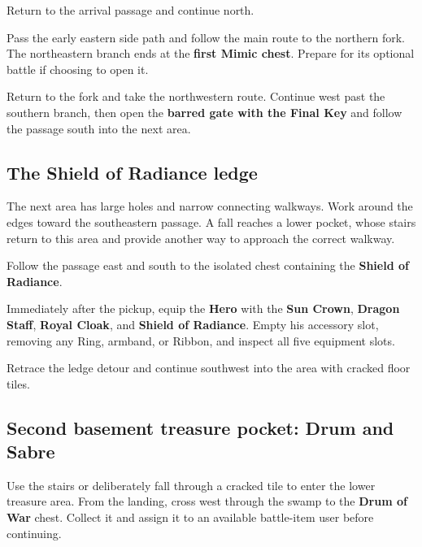 Return to the arrival passage and continue north.

Pass the early eastern side path and follow the main
route to the northern fork. The northeastern branch
ends at the \textbf{first Mimic chest}. Prepare for
its optional battle if choosing to open it.

Return to the fork and take the northwestern route.
Continue west past the southern branch, then open
the \textbf{barred gate with the Final Key} and follow
the passage south into the next area.

\subsection*{The Shield of Radiance ledge}

The next area has large holes and narrow connecting
walkways. Work around the edges toward the southeastern
passage. A fall reaches a lower pocket, whose stairs
return to this area and provide another way to approach
the correct walkway.

Follow the passage east and south to the isolated chest
containing the \textbf{Shield of Radiance}.

Immediately after the pickup, equip the \textbf{Hero} with the
\textbf{Sun Crown}, \textbf{Dragon Staff}, \textbf{Royal Cloak},
and \textbf{Shield of Radiance}. Empty his accessory slot, removing
any Ring, armband, or Ribbon, and inspect all five equipment slots.


Retrace the ledge detour and continue southwest into the area
with cracked floor tiles.

\subsection*{Second basement treasure pocket: Drum and Sabre}

Use the stairs or deliberately fall through a cracked
tile to enter the lower treasure area. From the landing,
cross west through the swamp to the \textbf{Drum of War}
chest. Collect it and assign it to an available battle-item
user before continuing.


